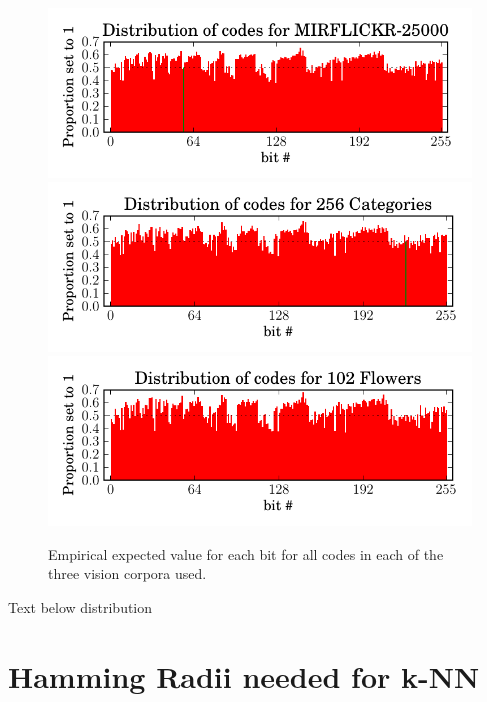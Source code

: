 \begin{figure}[H]
\figfont
\centering
\includegraphics{test5/mirflickr.pdf}
\includegraphics{test5/catagories.pdf}
\includegraphics{test5/102flowers.pdf}
\captionsetup{width=10cm}
\caption{Empirical expected value for each bit for all codes in each of the three vision corpora used.}
\label{fig:bitdist}
\end{figure}

Text below distribution

\section{Hamming Radii needed for k-NN}

